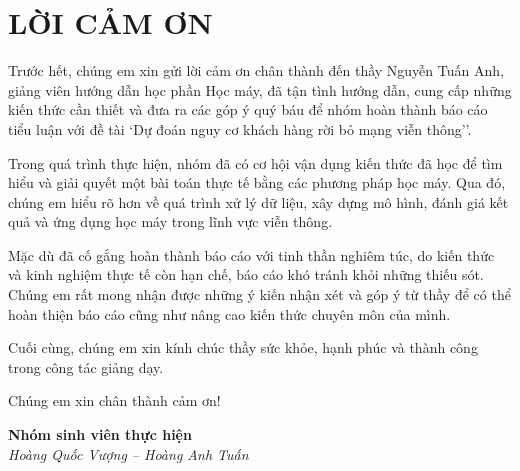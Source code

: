 \documentclass[a4paper]{article}
\begin{document}
\section*{\textbf{LỜI CẢM ƠN}}

Trước hết, chúng em xin gửi lời cảm ơn chân thành đến thầy Nguyễn Tuấn Anh, giảng viên hướng dẫn học phần Học máy, đã tận tình hướng dẫn, cung cấp những kiến thức cần thiết và đưa ra các góp ý quý báu để nhóm hoàn thành báo cáo tiểu luận với đề tài `Dự đoán nguy cơ khách hàng rời bỏ mạng viễn thông''.

Trong quá trình thực hiện, nhóm đã có cơ hội vận dụng kiến thức đã học để tìm hiểu và giải quyết một bài toán thực tế bằng các phương pháp học máy. Qua đó, chúng em hiểu rõ hơn về quá trình xử lý dữ liệu, xây dựng mô hình, đánh giá kết quả và ứng dụng học máy trong lĩnh vực viễn thông.

Mặc dù đã cố gắng hoàn thành báo cáo với tinh thần nghiêm túc, do kiến thức và kinh nghiệm thực tế còn hạn chế, báo cáo khó tránh khỏi những thiếu sót. Chúng em rất mong nhận được những ý kiến nhận xét và góp ý từ thầy để có thể hoàn thiện báo cáo cũng như nâng cao kiến thức chuyên môn của mình.

Cuối cùng, chúng em xin kính chúc thầy sức khỏe, hạnh phúc và thành công trong công tác giảng dạy.

Chúng em xin chân thành cảm ơn!

\vspace{1.2cm}
\begin{flushright}
\begin{minipage}{0.55\textwidth}
\centering
\textbf{Nhóm sinh viên thực hiện}\\[0.25cm]
\textit{Hoàng Quốc Vượng -- Hoàng Anh Tuấn}
\end{minipage}
\end{flushright}

\newpage
\end{document}
